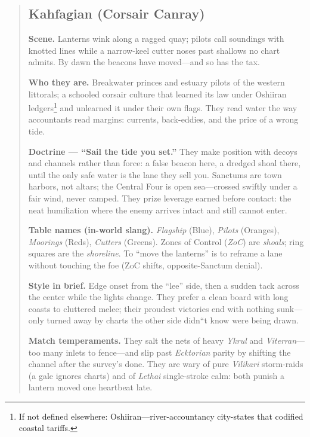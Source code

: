 \documentclass[11pt]{article}
\begin{document}
\begin{quote}
\subsection{Kahfagian (Corsair Canray)}
\noindent\textbf{Scene.} Lanterns wink along a ragged quay; pilots call soundings with knotted lines while a narrow-keel cutter noses past shallows no chart admits. By dawn the beacons have moved---and so has the tax.

\medskip
\noindent\textbf{Who they are.} Breakwater princes and estuary pilots of the western littorals; a schooled corsair culture that learned its law under Oshiiran ledgers\footnote{If not defined elsewhere: Oshiiran---river-accountancy city-states that codified coastal tariffs.} and unlearned it under their own flags. They read water the way accountants read margins: currents, back-eddies, and the price of a wrong tide.

\medskip
\noindent\textbf{Doctrine --- ``Sail the tide you set.''} They make position with decoys and channels rather than force: a false beacon here, a dredged shoal there, until the only safe water is the lane they sell you. Sanctums are town harbors, not altars; the Central Four is open sea---crossed swiftly under a fair wind, never camped. They prize leverage earned before contact: the neat humiliation where the enemy arrives intact and still cannot enter.

\medskip
\noindent\textbf{Table names (in-world slang).} \emph{Flagship} (Blue), \emph{Pilots} (Oranges), \emph{Moorings} (Reds), \emph{Cutters} (Greens). Zones of Control (\emph{ZoC}) are \emph{shoals}; ring squares are the \emph{shoreline}. To ``move the lanterns'' is to reframe a lane without touching the foe (ZoC shifts, opposite-Sanctum denial).

\medskip
\noindent\textbf{Style in brief.} Edge onset from the ``lee'' side, then a sudden tack across the center while the lights change. They prefer a clean board with long coasts to cluttered melee; their proudest victories end with nothing sunk---only turned away by charts the other side didn``t know were being drawn.

\medskip
\noindent\textbf{Match temperaments.} They salt the nets of heavy \textit{Ykrul} and \textit{Viterran}---too many inlets to fence---and slip past \textit{Ecktorian} parity by shifting the channel after the survey's done. They are wary of pure \textit{Vilikari} storm-raids (a gale ignores charts) and of \textit{Lethai} single-stroke calm: both punish a lantern moved one heartbeat late.


\end{quote}
\end{document}
